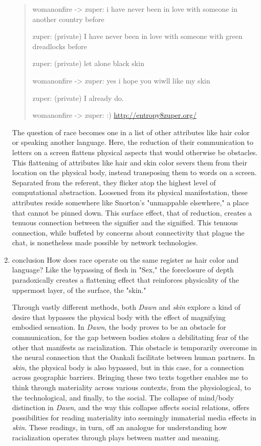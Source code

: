\documentclass[11pt]{article}
\begin{document}
\begin{enumerate}
\begin{quote}
womanonfire -> zuper: i have never been in love with someone in another country before

zuper: (private) I have never been in love with someone with green dreadlocks before

zuper: (private) let alone black skin

womanonfire -> zuper: yes i hope you wiwll like my skin

zuper: (private) I already do.

womanonfire -> zuper: :) \url{http://entropy8zuper.org/} 
\end{quote}
The question of race becomes one in a list of other attributes like
hair color or speaking another language. Here, the reduction of their
communication to letters on a screen flattens physical aspects that
would otherwise be obstacles. This flattening of attributes like hair
and skin color severs them from their location on the physical body,
instead transposing them to words on a screen. Separated from the
referent, they flicker atop the highest level of computational
abstraction. Loosened from its physical manifestation, these
attributes reside somewhere like Snorton's "unmappable elsewhere," a
place that cannot be pinned down. This surface effect, that of
reduction, creates a tenuous connection between the signifier and the
signified. This tenuous connection, while buffeted by concerns about
connectivity that plague the chat, is nonetheless made possible by
network technologies.

\item conclusion
\label{sec:orgb39a355}
How does race operate on the same register as hair color and language?
Like the bypassing of flesh in "Sex," the foreclosure of depth
paradoxically creates a flattening effect that reinforces physicality
of the uppermost layer, of the surface, the "skin." 

Through vastly different methods, both \emph{Dawn} and \emph{skin} explore a
kind of desire that bypasses the physical body with the effect of
magnifying embodied sensation. In \emph{Dawn}, the body proves to be an
obstacle for communication, for the gap between bodies stokes a
debilitating fear of the other that manifests as racialization. This
obstacle is temporarily overcome in the neural connection that the
Oankali facilitate between human partners. In \emph{skin}, the physical
body is also bypassed, but in this case, for a connection across
geographic barriers. Bringing these two texts together enables me to
think through materiality across various contexts, from the
physiological, to the technological, and finally, to the social. The
collapse of mind/body distinction in \emph{Dawn}, and the way this collapse
affects social relations, offers possibilities for reading materiality
into seemingly immaterial media effects in \emph{skin}. These readings, in
turn, off an analogue for understanding how racialization operates
through plays between matter and meaning.


\end{enumerate}
\end{document}

